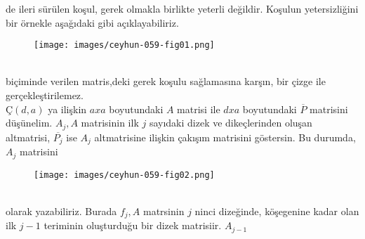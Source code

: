 \documentclass[11pt]{amsbook}
\begin{document}
	
	 de ileri sürülen koşul, gerek olmakla birlikte yeterli değildir. Koşulun yetersizliğini bir örnekle aşağıdaki gibi açıklayabiliriz.
	\begin{figure}[htbp]
		\centering
		\texttt{[image: images/ceyhun-059-fig01.png]}
	\end{figure} \\ 
	biçiminde verilen matris,deki gerek koşulu sağlamasına karşın, bir çizge ile gerçekleştirilemez. \\
	
	$ Ç(d,a) $ ya ilişkin $a x a$ boyutundaki $A$ matrisi ile $d x a$ boyutundaki $\overline{P}$ matrisini düşünelim. $ A_j, A $ matrisinin ilk $j$ sayıdaki dizek ve dikeçlerinden oluşan altmatrisi, $ \overline{P_j}$ ise $A_j$ altmatrisine ilişkin çakışım matrisini göstersin. Bu durumda, $A_j$ matrisini
	\begin{figure}[htbp]
		\centering
		\texttt{[image: images/ceyhun-059-fig02.png]}
	\end{figure} \\
	olarak yazabiliriz. Burada $f_j,A $ matrsinin $j$ ninci dizeğinde, köşegenine kadar olan ilk $j-1$ teriminin oluşturduğu bir dizek matrisiir. $A_{j-1}$
 
\end{document}
